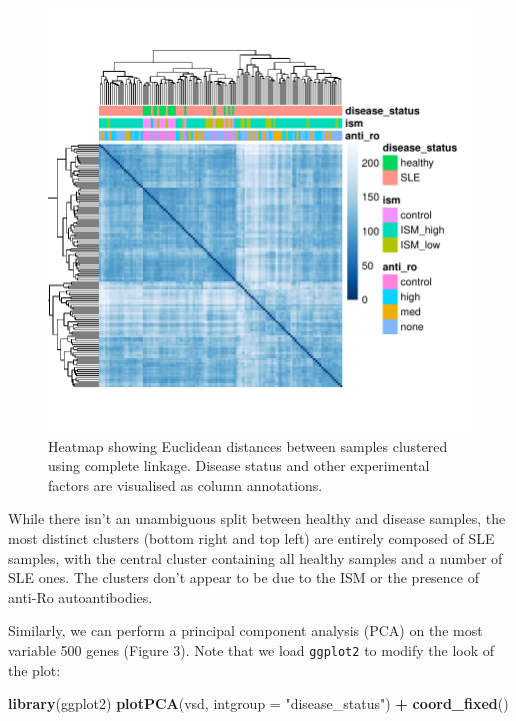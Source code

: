 \documentclass[9pt,a4paper,]{extarticle}
\newenvironment{Shaded}{\begin{snugshade}}{\end{snugshade}}
\newcommand{\KeywordTok}[1]{\textcolor[rgb]{0.13,0.29,0.53}{\textbf{#1}}}
\newcommand{\DataTypeTok}[1]{\textcolor[rgb]{0.13,0.29,0.53}{#1}}
\newcommand{\StringTok}[1]{\textcolor[rgb]{0.31,0.60,0.02}{#1}}
\newcommand{\OperatorTok}[1]{\textcolor[rgb]{0.81,0.36,0.00}{\textbf{#1}}}
\newcommand{\NormalTok}[1]{#1}
\theoremstyle{definition}
\theoremstyle{definition}
\theoremstyle{definition}
\theoremstyle{remark}
\begin{document}
\begin{figure}

{\centering \includegraphics{biocondutor-regulatory-genomics-workflow_files/figure-latex/figure2-1} 

}

\caption{Heatmap showing Euclidean distances between samples clustered using complete linkage. Disease status and other experimental factors are visualised as column annotations.}\label{fig:figure2}
\end{figure}

While there isn't an unambiguous split between healthy and disease samples, the most distinct clusters (bottom right and top left) are entirely composed of SLE samples, with the central cluster containing all healthy samples and a number of SLE ones.
The clusters don't appear to be due to the ISM or the presence of anti-Ro autoantibodies.

Similarly, we can perform a principal component analysis (PCA) on the most variable 500 genes (Figure 3).
Note that we load \texttt{ggplot2} \citep{Wickham2009} to modify the look of the plot:

\begin{Shaded}
\begin{Highlighting}[]
\KeywordTok{library}\NormalTok{(ggplot2)}
\KeywordTok{plotPCA}\NormalTok{(vsd, }\DataTypeTok{intgroup =} \StringTok{"disease_status"}\NormalTok{) }\OperatorTok{+}
\StringTok{  }\KeywordTok{coord_fixed}\NormalTok{()}
\end{Highlighting}
\end{Shaded}
\end{document}
